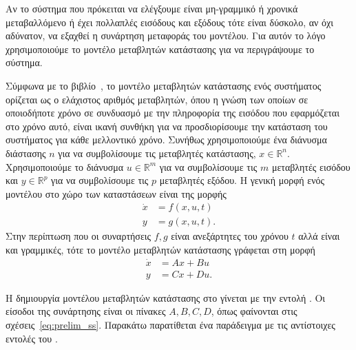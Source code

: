 Αν το σύστημα που πρόκειται να ελέγξουμε είναι μη-γραμμικό ή χρονικά
μεταβαλλόμενο ή έχει πολλαπλές εισόδους και εξόδους τότε είναι δύσκολο, αν όχι
αδύνατον, να εξαχθεί η συνάρτηση μεταφοράς του μοντέλου. Για αυτόν το λόγο
χρησιμοποιούμε το μοντέλο μεταβλητών κατάστασης για να περιγράψουμε το σύστημα.

Σύμφωνα με το βιβλίο~\cite{lin2007robust}, το μοντέλο μεταβλητών κατάστασης ενός
συστήματος ορίζεται ως ο ελάχιστος αριθμός μεταβλητών, όπου η γνώση των οποίων
σε οποιοδήποτε χρόνο σε συνδυασμό με την πληροφορία της εισόδου που εφαρμόζεται
στο χρόνο αυτό, είναι ικανή συνθήκη για να προσδιορίσουμε την κατάσταση του
συστήματος για κάθε μελλοντικό χρόνο. Συνήθως χρησιμοποιούμε ένα διάνυσμα
διάστασης \( n \) για να συμβολίσουμε τις μεταβλητές κατάστασης, \( x \in
\mathbb{R}^n \).  Χρησιμοποιούμε το διάνυσμα \( u \in \mathbb{R}^m \) για να
συμβολίσουμε τις \( m \) μεταβλητές εισόδου και \( y \in \mathbb{R}^p \) για να
συμβολίσουμε τις \( p \) μεταβλητές εξόδου. Η γενική μορφή ενός μοντέλου στο
χώρο των καταστάσεων είναι της μορφής
\begin{align*}
    \dot{x} &= f(x, u, t) \\
    y &= g(x, u, t).
\end{align*}
Στην περίπτωση που οι συναρτήσεις \( f, g \) είναι ανεξάρτητες του χρόνου
\( t \) αλλά είναι και γραμμικές, τότε το μοντέλο μεταβλητών κατάστασης
γράφεται στη μορφή
\begin{align}\label{eq:prelim_ss}
    \dot{x} &= Ax + Bu\nonumber \\
    y &= Cx + Du.
\end{align}

Η δημιουργία μοντέλου μεταβλητών κατάστασης στο  γίνεται με την
εντολή .
Οι είσοδοι της συνάρτησης είναι οι πίνακες \( A, B, C, D \), όπως φαίνονται
στις σχέσεις~\eqref{eq:prelim_ss}. Παρακάτω παρατίθεται ένα παράδειγμα με τις
αντίστοιχες εντολές του .
\eng{}

